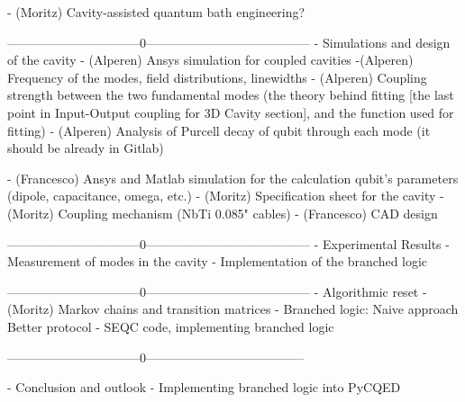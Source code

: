     - (Moritz) Cavity-assisted quantum bath engineering? 
    
--------------------------------0---------------------------------------     
- Simulations and design of the cavity
    - (Alperen) Ansys simulation for coupled cavities
        -(Alperen) Frequency of the modes, field distributions, linewidths
        - (Alperen) Coupling strength between the two fundamental modes (the theory behind fitting [the last point in Input-Output coupling for 3D Cavity section], and the function used for fitting)
        - (Alperen) Analysis of Purcell decay of qubit through each mode (it should be already in Gitlab)
        
    - (Francesco) Ansys and Matlab simulation for the calculation qubit's parameters (dipole, capacitance, omega, etc.)
    - (Moritz) Specification sheet for the cavity
    - (Moritz) Coupling mechanism (NbTi 0.085" cables)
    - (Francesco) CAD design 

--------------------------------0--------------------------------------- 
- Experimental Results
    - Measurement of modes in the cavity
    - Implementation of the branched logic
    
--------------------------------0--------------------------------------- 
- Algorithmic reset
    - (Moritz) Markov chains and transition matrices
        - Branched logic:
        Naive approach
        Better protocol
    - SEQC code, implementing branched logic 

 --------------------------------0--------------------------------------
 
- Conclusion and outlook
    - Implementing branched logic into PyCQED